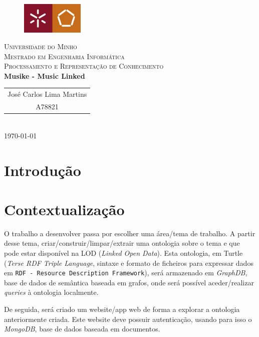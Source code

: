 \documentclass{article}
\begin{document}
{
\center
\begin{figure}[H]
        \centering
        \includegraphics[width=3cm]{Pictures/UM_EENG.jpg}
\end{figure}
\textsc{\Large Universidade do Minho} \\ [0.5cm]
\textsc{\Large Mestrado em Engenharia Informática} \\ [0.5cm]
\textsc{\large Processamento e Representação de Conhecimento} \\ [0.5cm]

{\LARGE \bfseries Musike - Music Linked} \\[0.5cm]

\begin{tabular}{c} 
    José Carlos Lima Martins \\
    A78821 \\
\end{tabular} \\[0.5cm]

\today \\[1cm]
}

\section{Introdução}


\tableofcontents

\section{Contextualização}

O trabalho a desenvolver passa por escolher uma área/tema de trabalho. A partir desse tema, criar/construir/limpar/extrair uma ontologia sobre o tema e que pode estar disponível na LOD (\textit{Linked Open Data}). Esta ontologia, em Turtle (\textit{Terse RDF Triple Language}, sintaxe e formato de ficheiros para expressar dados em \texttt{RDF - Resource Description Framework}), será armazenado em \textit{GraphDB}, base de dados de semântica baseada em grafos, onde será possível aceder/realizar \textit{queries} à ontologia localmente.

De seguida, será criado um website/app web de forma a explorar a ontologia anteriormente criada. Este website deve possuir autenticação, usando para isso o \textit{MongoDB}, base de dados baseada em documentos.
\end{document}
